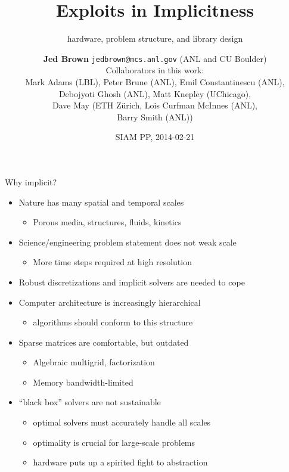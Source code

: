 \documentclass{beamer}
\title{Exploits in Implicitness}
\subtitle{hardware, problem structure, and library design}
\author{{\bf Jed Brown} \texttt{jedbrown@mcs.anl.gov} (ANL and CU Boulder) \\
  Collaborators in this work: \\
  \quad Mark Adams (LBL), Peter Brune (ANL), Emil Constantinescu (ANL), \\
Debojyoti Ghosh (ANL), Matt Knepley (UChicago),  \\
Dave May (ETH Z\"urich, Lois Curfman McInnes (ANL), \\
Barry Smith (ANL))
}
\date{SIAM PP, 2014-02-21}
\begin{document}
\lstset{language=C}
\normalem

\begin{frame}
  \titlepage
\end{frame}

\begin{frame}{Why implicit?}
  \begin{itemize}
  \item Nature has many spatial and temporal scales
    \begin{itemize}
    \item Porous media, structures, fluids, kinetics
    \end{itemize}
  \item Science/engineering problem statement does not weak scale
    \begin{itemize}
    \item More time steps required at high resolution
    \end{itemize}
  \item Robust discretizations and implicit solvers are needed to cope
  \item Computer architecture is increasingly hierarchical
    \begin{itemize}
    \item algorithms should conform to this structure
    \end{itemize}
  \item Sparse matrices are comfortable, but outdated
    \begin{itemize}
    \item Algebraic multigrid, factorization
    \item Memory bandwidth-limited
    \end{itemize}
  \item ``black box'' solvers are not sustainable
    \begin{itemize}
    \item optimal solvers must accurately handle all scales
    \item optimality is crucial for large-scale problems
    \item hardware puts up a spirited fight to abstraction
    \end{itemize}
  \end{itemize}
\end{frame}







\end{document}
